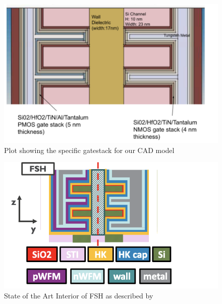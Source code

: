 \documentclass[letterpaper, 12 pt, conference]{ieeeconf}  %
\begin{document}
\begin{figure}[H]
    \centering
    \includegraphics[width=.9\linewidth]{Screen Shot 2022-02-26 at 9.27.22 PM.png}
    \caption{Plot showing the specific gatestack for our CAD model}
    \label{fig:knngraph1}
\end{figure}

\begin{figure}[H]
    \centering
    \includegraphics[width=.9\linewidth]{Screen Shot 2022-02-26 at 10.04.03 PM.png}
    \caption{State of the Art Interior of FSH as described by \cite{c1} }
    \label{fig:knngraph1}
\end{figure}
\end{document}
